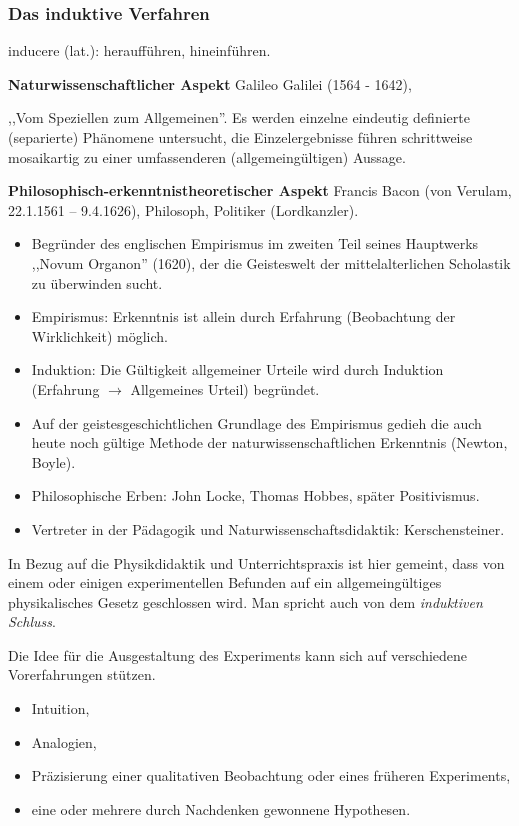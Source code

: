 \subsubsection{Das induktive Verfahren}

inducere (lat.): herauff\"{u}hren, hineinf\"{u}hren.

\mip
{\bf Naturwissenschaftlicher Aspekt} Galileo Galilei  (1564 - 1642),

,,Vom Speziellen zum Allgemeinen''.
Es werden einzelne eindeutig definierte (separierte) Ph\"{a}nomene
untersucht, die Einzelergebnisse f\"{u}hren schrittweise
mosaikartig zu einer umfassenderen (allgemeing\"{u}ltigen) Aussage.


\bip
{\bf Philosophisch-erkenntnistheoretischer Aspekt}
Francis Bacon (von Verulam, 22.1.1561 -- 9.4.1626),
Philosoph, Politiker (Lordkanzler).

\begin{itemize}
\item Begr\"{u}nder des englischen Empirismus im zweiten Teil seines
Hauptwerks ,,Novum Organon'' (1620), der die Geisteswelt der
mittelalterlichen Scholastik zu \"{u}berwinden sucht.
\item Empirismus: Erkenntnis ist allein durch Erfahrung
(Beobachtung der Wirklichkeit) m\"{o}glich.
\item Induktion: Die G\"{u}ltigkeit allgemeiner Urteile wird
durch Induktion (Erfahrung $\to$ Allgemeines Urteil)
begr\"{u}ndet.
\item Auf der geistes\-ge\-schicht\-lichen Grundlage
des Empirismus gedieh die auch heute noch g\"{u}ltige Methode der
naturwissenschaftlichen Erkenntnis (Newton, Boyle).
\item Philosophische Erben: John Locke, Thomas Hobbes,
sp\"{a}ter Positivismus.
\item
Vertreter in der P\"{a}dagogik und Naturwissenschafts\-didaktik:
Kerschensteiner.
\end{itemize}

In Bezug auf die Physikdidaktik und Unterrichtspraxis ist hier gemeint,
dass von einem oder einigen experimentellen Befunden auf ein
allgemeing\"{u}ltiges physikalisches Gesetz geschlossen wird.
Man spricht auch von dem \textit{induktiven Schluss}.

Die Idee f\"{u}r die Ausgestaltung des Experiments kann sich auf
verschiedene Vorerfahrungen st\"{u}tzen.

\begin{itemize}
\item Intuition,
\item Analogien,
\item Pr\"{a}zisierung einer qualitativen Beobachtung oder eines
fr\"{u}heren Experiments,
\item eine oder mehrere durch Nachdenken gewonnene Hypothesen.
\end{itemize}

